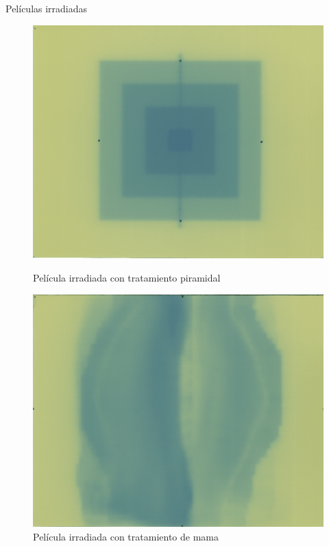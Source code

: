 \documentclass[12pt]{beamer}
\begin{document}
\begin{frame}{Películas irradiadas}
\begin{figure}[htp]
\begin{minipage}{0.4\textwidth}
	\includegraphics[width=\textwidth]{images/peliculaPiramide.png}
	\caption{Película irradiada con tratamiento piramidal}
\end{minipage}\hfill
\begin{minipage}{0.4\textwidth}
	\includegraphics[width=\textwidth]{images/peliculaMama.png}
	\caption{Película irradiada con tratamiento de mama}
\end{minipage}

\end{figure}
\end{frame}
\end{document}
